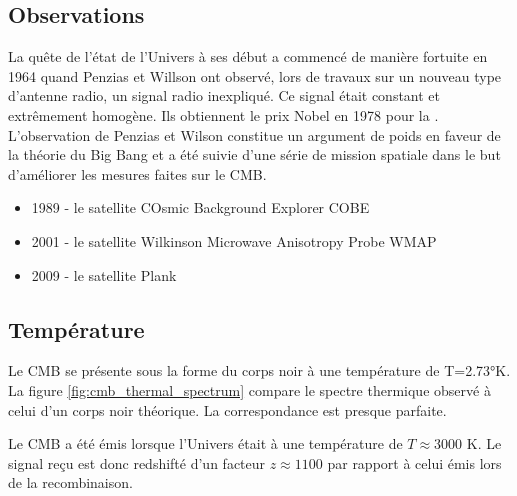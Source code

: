 \subsection{Observations}

La quête de l'état de l'Univers à ses début a commencé de manière fortuite en 1964 quand Penzias et Willson ont observé, lors de travaux sur un nouveau type d’antenne radio, un signal radio inexpliqué.
Ce signal était constant et extrêmement homogène. 
Ils obtiennent le prix Nobel en 1978 pour la \cite{PenziasWilsonNobel}.
L'observation de Penzias et Wilson constitue un argument de poids en faveur de la théorie du Big Bang et a été suivie d'une série de mission spatiale dans le but d'améliorer les mesures faites sur le \ac{CMB}.

\begin{itemize}
\item 1989 - le satellite COsmic Background Explorer COBE 
\item 2001 - le satellite Wilkinson Microwave Anisotropy Probe WMAP
\item 2009 - le satellite Plank
\end{itemize}

\subsection{Température}
Le \ac{CMB} se présente sous la forme du corps noir à une température de T=2.73°K.
La figure \ref{fig:cmb_thermal_spectrum} compare le spectre thermique observé à celui d'un corps noir théorique. 
La correspondance est presque parfaite.

Le \ac{CMB} a été émis lorsque l'Univers était à une température de $T \approx 3000$ K.
Le signal reçu est donc redshifté d'un facteur $z\approx1100$ par rapport à celui émis lors de la recombinaison.

